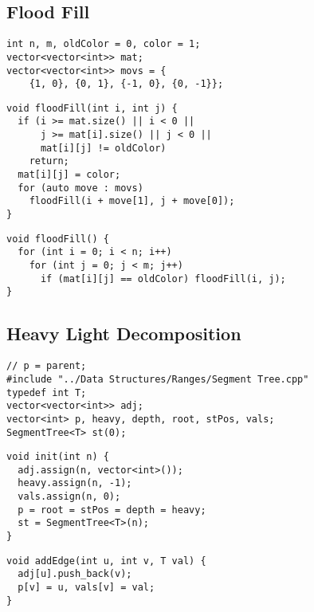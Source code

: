\documentclass[twoside]{article}
\begin{document}
\begin{multicols*}{2}
\subsectionfont{\large\bfseries\sffamily\underline}
\subsection*{Flood Fill}
\begin{verbatim}
int n, m, oldColor = 0, color = 1;
vector<vector<int>> mat;
vector<vector<int>> movs = {
    {1, 0}, {0, 1}, {-1, 0}, {0, -1}};
\end{verbatim}
\vspace{-12pt}
\begin{verbatim}
void floodFill(int i, int j) {
  if (i >= mat.size() || i < 0 ||
      j >= mat[i].size() || j < 0 ||
      mat[i][j] != oldColor)
    return;
  mat[i][j] = color;
  for (auto move : movs)
    floodFill(i + move[1], j + move[0]);
}
\end{verbatim}
\vspace{-12pt}
\begin{verbatim}
void floodFill() {
  for (int i = 0; i < n; i++)
    for (int j = 0; j < m; j++)
      if (mat[i][j] == oldColor) floodFill(i, j);
}
\end{verbatim}

\subsectionfont{\large\bfseries\sffamily\underline}
\subsection*{Heavy Light Decomposition}
\begin{verbatim}
// p = parent;
#include "../Data Structures/Ranges/Segment Tree.cpp"
typedef int T;
vector<vector<int>> adj;
vector<int> p, heavy, depth, root, stPos, vals;
SegmentTree<T> st(0);
\end{verbatim}
\vspace{-12pt}
\begin{verbatim}
void init(int n) {
  adj.assign(n, vector<int>());
  heavy.assign(n, -1);
  vals.assign(n, 0);
  p = root = stPos = depth = heavy;
  st = SegmentTree<T>(n);
}
\end{verbatim}
\vspace{-12pt}
\begin{verbatim}
void addEdge(int u, int v, T val) {
  adj[u].push_back(v);
  p[v] = u, vals[v] = val;
}


\end{verbatim}
\end{multicols*}
\end{document}
